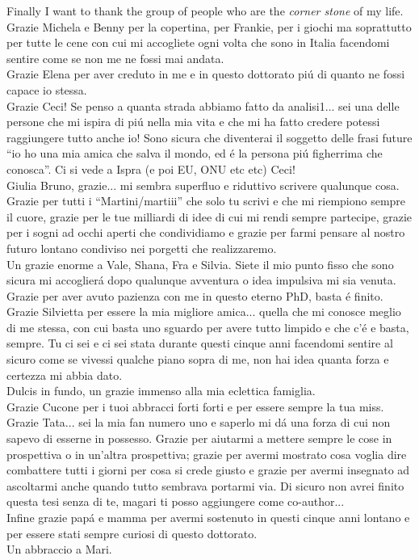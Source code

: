 \begin{acknowledgements}
{Finally I want to thank the group of people who are the \emph{corner stone} of my life. \\
Grazie Michela e Benny per la copertina, per Frankie, per i giochi ma soprattutto per tutte le cene con cui mi accogliete ogni volta che sono in Italia facendomi sentire come se non me ne fossi mai andata. \\
Grazie Elena per aver creduto in me e in questo dottorato pi\'u di quanto ne fossi capace io stessa. \\
Grazie Ceci! Se penso a quanta strada abbiamo fatto da analisi1... sei una delle persone che mi ispira di pi\'u nella mia vita e che mi ha fatto credere potessi raggiungere tutto anche io! Sono sicura che diventerai il soggetto delle frasi future ``io ho una mia amica che salva il mondo, ed \'e la persona pi\'u figherrima che conosca''. Ci si vede a Ispra (e poi EU, ONU etc etc) Ceci!\\
Giulia Bruno, grazie... mi sembra superfluo e riduttivo scrivere qualunque cosa. Grazie per tutti i ``Martini/martiii'' che solo tu scrivi e che mi riempiono sempre il cuore, grazie per le tue milliardi di idee di cui mi rendi sempre partecipe, grazie per i sogni ad occhi aperti che condividiamo e grazie per farmi pensare al nostro futuro lontano condiviso nei porgetti che realizzaremo. \\
Un grazie enorme a Vale, Shana, Fra e Silvia. Siete il mio punto fisso che sono sicura mi accoglier\'a dopo qualunque avventura o idea impulsiva mi sia venuta. Grazie per aver avuto pazienza con me in questo eterno PhD, basta \'e finito. \\
Grazie Silvietta per essere la mia migliore amica... quella che mi conosce meglio di me stessa, con cui basta uno sguardo per avere tutto limpido e che c'\'e e basta, sempre. Tu ci sei e ci sei stata durante questi cinque anni facendomi sentire al sicuro come se vivessi qualche piano sopra di me, non hai idea quanta forza e certezza mi abbia dato.\\
Dulcis in fundo, un grazie immenso alla mia eclettica famiglia.\\
Grazie Cucone per i tuoi abbracci forti forti e per essere sempre la tua miss.\\
Grazie Tata... sei la mia fan numero uno e saperlo mi d\'a una forza di cui non sapevo di esserne in possesso. Grazie per aiutarmi a mettere sempre le cose in prospettiva o in un'altra prospettiva; grazie per avermi mostrato cosa voglia dire combattere tutti i giorni per cosa si crede giusto e grazie per avermi insegnato ad ascoltarmi anche quando tutto sembrava portarmi via. Di sicuro non avrei finito questa tesi senza di te, magari ti posso aggiungere come co-author... \\
Infine grazie pap\'a e mamma per avermi sostenuto in questi cinque anni lontano e per essere stati sempre curiosi di questo dottorato.\\
Un abbraccio a Mari.





}
\end{acknowledgements}
